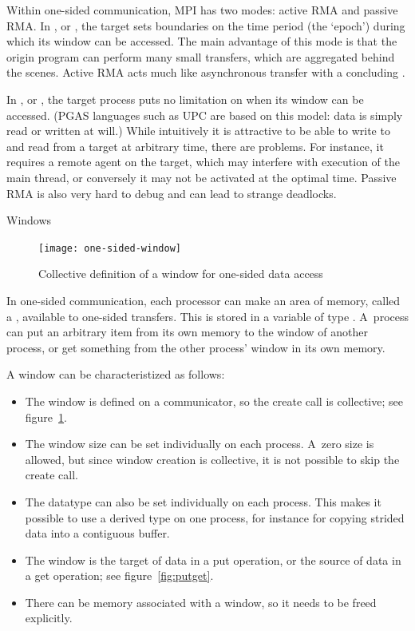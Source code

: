 Within one-sided communication, MPI has two modes: active RMA and
passive RMA. In , or ,
the target sets boundaries on the time period (the `epoch')
during which its window can be accessed.
The main advantage
of this mode is that the origin program can perform many small transfers, which are
aggregated behind the scenes. Active RMA acts much like asynchronous transfer with a
concluding .

In , or ,
the target process puts no limitation on when its window can be accessed.
(\ac{PGAS} languages such as \ac{UPC} are based on this model: data is 
simply read or written at will.)
While 
intuitively it is attractive to be able to write to and read from a target at
arbitrary time,
there are problems. For instance, it requires a remote agent on the target,
which may interfere with execution of the main thread, or conversely it may not be
activated at the optimal time. Passive RMA is also very hard to debug and can lead
to strange deadlocks.


 {Windows}
\label{sec:windows}

\begin{figure}[ht]
  \texttt{[image: one-sided-window]}
  \caption{Collective definition of a window for one-sided data access}
  \label{fig:window}
\end{figure}

In one-sided communication, each processor can make an area of memory,
called a , available to one-sided transfers.
%
This is stored in a variable of type .
%
A~process can put an arbitrary item from its own memory to the
window of another process, or get something from the other process'
window in its own memory.

A window can be characteristized as follows:
\begin{itemize}
\item The window is defined on a communicator, so the create call
  is collective; see figure~\ref{fig:window}. 
\item The window size can be set individually on each process.
  A~zero size is allowed, but since window creation is collective,
  it is not possible to skip the create call.
\item The datatype can also be set individually on each process. This
  makes it possible to use a derived type on one process, for instance
  for copying strided data into a contiguous buffer.
\item The window is the target of data in a put operation, or the
  source of data in a get operation; see figure~\ref{fig:putget}.
\item There can be memory associated with a window, so it needs to be
  freed explicitly.
\end{itemize}

